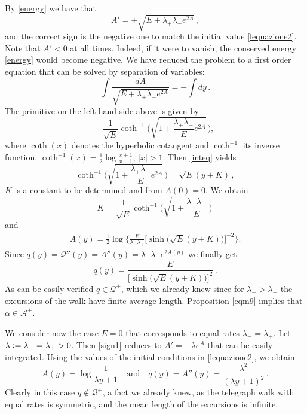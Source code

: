 \documentclass[12pt]{article}
\numberwithin{equation}{section}
\begin{document}
By \eqref{energy} we have that
\begin{equation}\label{sign1}
	A'=\pm \sqrt{E+\lambda_+\lambda_-e^{2A}}\, , 
\end{equation}
and the correct sign is the negative one to match the initial value \eqref{lequazione2}. Note that $A'<0$ at all times. Indeed, if it were to vanish, the conserved energy \eqref{energy} would become negative. We have reduced the problem to a first order equation that can be solved by separation of variables:
\begin{equation}\label{inteq}
	\int \frac{dA}{\sqrt{E+\lambda_+\lambda_-e^{2A}}}=-\int dy\, .
\end{equation}
The primitive on the left-hand side above is given by
\begin{equation}
	-\frac{1}{\sqrt E}\coth^{-1}\Big(\sqrt{1+\frac{\lambda_+\lambda_-}{E}e^{2A}}\,\Big),
\end{equation}
where $\coth(x)$ denotes the hyperbolic cotangent and $\coth^{-1}$ its inverse function,
$\coth^{-1}(x)=\frac 12 \log\frac{x+1}{x-1}$, $|x|>1$. Then \eqref{inteq} yields
\begin{equation}
	\coth^{-1}\Big(\sqrt{1+\frac{\lambda_+\lambda_-}{E}e^{2A}}\,\Big)=\sqrt E(y+K)\, , 
\end{equation}
 $K$ is a constant to be determined and from $A(0)=0$. We obtain
\begin{equation}
	K=\frac{1}{\sqrt E}\coth^{-1}\Big(\sqrt{1+\frac{\lambda_+\lambda_-}{E}}\,\Big)\, 
\end{equation}
and
\begin{align}
	A(y)=\frac 12 \log \Big\{\frac{E}{\lambda_-\lambda_+}\Big[\sinh\Big(\sqrt E(y+K)\Big)\Big]^{-2}\Big\}.
\end{align}
Since $q(y)=\mathcal Q''(y)=A''(y)=\lambda_-\lambda_+ e^{2A(y)}$ we finally get
\begin{equation}\label{maxzz}
	q(y)=\frac{E}{\Big[\sinh\Big(\sqrt E(y+K)\Big)\Big]^{2}}\, .
\end{equation}
As can be easily verified $q\in \mathscr Q^+$, which we already knew since for $\lambda_+>\lambda_-$ the excursions of the walk have finite average length. Proposition \ref{eqm9} implies that $\alpha \in \mathcal A^+$.


\smallskip
We consider now the case $E=0$ that corresponds to equal rates $\lambda_-=\lambda_+$. 
Let $\lambda\vcentcolon=\lambda_-=\lambda_+>0$. Then \eqref{sign1} reduces to $A'=-\lambda e^A$ that can be easily integrated. Using the values of the initial conditions in \eqref{lequazione2}, we obtain
\begin{equation}
	A(y)=\log\frac{1}{\lambda y+1}\quad \text{and}\quad q(y)=A''(y)=\frac{\lambda^2}{(\lambda y +1)^2}\,.
\end{equation}
Clearly in this case $q\notin \mathscr Q^+$, a fact we already knew, as the telegraph walk with equal rates is symmetric, and the mean length of the excursions is infinite.
\end{document}
